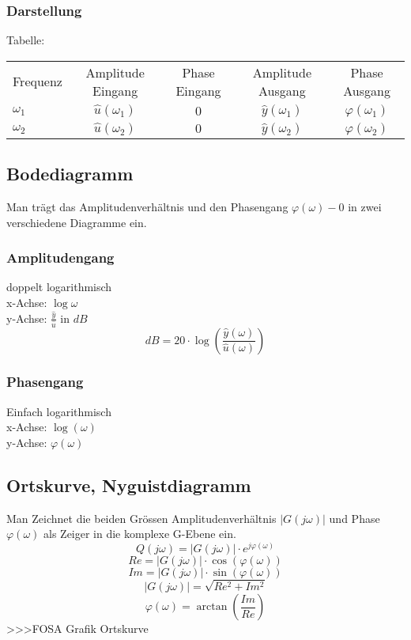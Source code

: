 \subsubsection{Darstellung}
Tabelle: \\
\begin{tabular}{lcccc}
Frequenz   & Amplitude Eingang & Phase Eingang & Amplitude Ausgang & Phase Ausgang \\
$\omega_1$ &
  $\hat{u}(\omega_1)$ &
  $0$ &
  $\hat{y}(\omega_1)$ &
  $\varphi(\omega_1)$ \\
$\omega_2$ &
  $\hat{u}(\omega_2)$ & 
  $0$ & 
  $\hat{y}(\omega_2)$ & 
  $\varphi(\omega_2)$ \\

\end{tabular}

\subsection{Bodediagramm}
Man trägt das Amplitudenverhältnis und den Phasengang $\varphi(\omega) - 0$ 
in zwei verschiedene Diagramme ein. 

\subsubsection{Amplitudengang}
doppelt logarithmisch\\
x-Achse: $\log \omega$ \\
y-Achse: $\frac{\hat{y}}{\hat{u}}$ in $dB$\\
\[ dB = 20 \cdot \log\left( \frac{\hat{y}(\omega)}{\hat{u}(\omega)} \right) \]

\subsubsection{Phasengang}
Einfach logarithmisch\\
x-Achse: $\log(\omega)$ \\
y-Achse: $\varphi(\omega)$ \\

\subsection{Ortskurve, Nyguistdiagramm}
Man Zeichnet die beiden Grössen Amplitudenverhältnis $|G(j \omega)|$ und 
Phase $\varphi(\omega)$ als Zeiger in die komplexe G-Ebene ein. 
\[ Q(j \omega) = |G(j \omega)| \cdot e^{j \varphi(\omega)} \]
\[ Re =  |G(j \omega)| \cdot \cos(\varphi(\omega)) \]
\[ Im =  |G(j \omega)| \cdot \sin(\varphi(\omega)) \]
\[ |G(j \omega)| = \sqrt{Re^2 + Im^2} \]
\[ \varphi(\omega) = \arctan(\frac{Im}{Re}) \]
>>>FOSA Grafik Ortskurve \\

